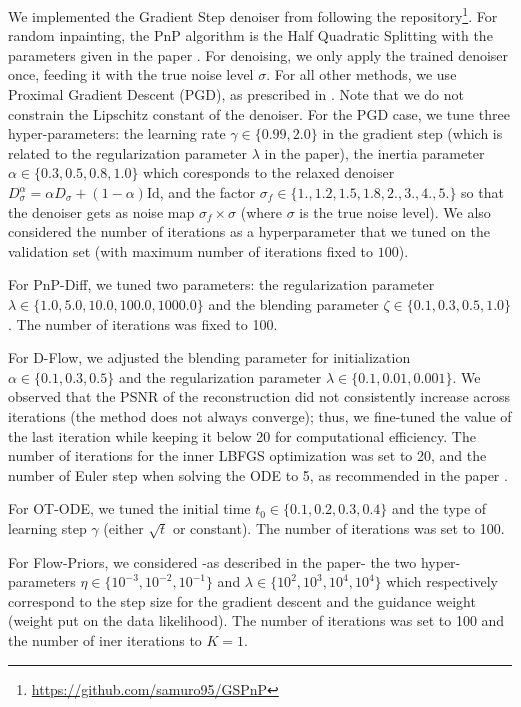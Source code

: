 \documentclass{article} %
\newcommand{\Id}{\mathrm{Id}}
\theoremstyle{definition}
\begin{document}
We implemented the Gradient Step denoiser from \citet{hurault2022gradient, hurault2022prox} following the repository\footnote{\hyperlink{GSPNP repository}{https://github.com/samuro95/GSPnP}}. 
For random inpainting, the PnP algorithm is the Half Quadratic Splitting with the parameters given in the paper \citep{hurault2022gradient}. 
For denoising, we only apply the trained denoiser once, feeding it with the true noise level $\sigma$.  For all other methods, we use Proximal Gradient Descent (PGD), as prescribed in \citet{hurault2022prox}. Note that we do not constrain the Lipschitz constant of the denoiser. For the PGD case, we tune three hyper-parameters: the learning rate $\gamma \in \{0.99, 2.0 \}$ in the gradient step (which is related to the regularization parameter $\lambda$ in the paper), the inertia parameter $\alpha \in \{0.3, 0.5, 0.8, 1.0\}$ which coresponds to the relaxed denoiser $D^\alpha_\sigma = \alpha D_\sigma + (1-\alpha) \Id$, and the factor $\sigma_f \in \{1., 1.2, 1.5, 1.8, 2., 3., 4., 5.\}$ so that the denoiser gets as noise map $\sigma_f \times \sigma$ (where $\sigma$ is the true noise level). We also considered the number of iterations as a hyperparameter that we tuned on the validation set (with maximum number of iterations fixed to $100$). 

For PnP-Diff, we tuned two parameters: the regularization parameter $\lambda \in \{1.0, 5.0, 10.0, 100.0, 1000.0\}$ and the blending parameter $\zeta \in \{0.1, 0.3, 0.5, 1.0\}$. The number of iterations was fixed to 100.

For D-Flow, we adjusted the blending parameter for initialization $\alpha \in \{0.1, 0.3, 0.5\}$ and the regularization parameter $\lambda \in \{0.1, 0.01, 0.001\}$. We observed that the PSNR of the reconstruction did not consistently increase across iterations (the method does not always converge); thus, we fine-tuned the value of the last iteration while keeping it below 20 for computational efficiency. The number of iterations for the inner LBFGS optimization was set to 20, and the number of Euler step when solving the ODE to 5, as recommended in the paper \cite{ben2024dflow}.

For OT-ODE, we tuned the initial time $t_0 \in \{0.1, 0.2, 0.3, 0.4\}$ and the type of learning step $\gamma$ (either $\sqrt{t}$ or constant). The number of iterations was set to 100.

For Flow-Priors, we considered -as described in the paper- the two hyper-parameters $\eta \in \{10^{-3}, 10^{-2}, 10^{-1} \}$ and $\lambda \in \{10^2, 10^3, 10^4, 10^4\}$ which respectively correspond to the step size for the gradient descent and the guidance weight (weight put on the data likelihood). The number of iterations was set to 100 and the number of iner iterations to $K=1$.
\end{document}
